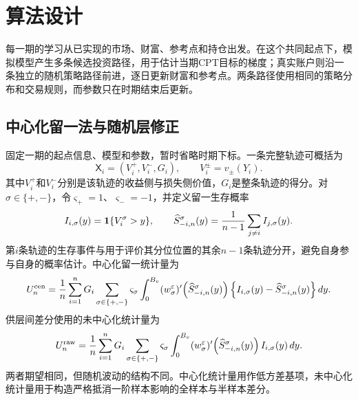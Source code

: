 \chapter{算法设计}\label{sec:algorithm}

每一期的学习从已实现的市场、财富、参考点和持仓出发。在这个共同起点下，模拟模型产生多条候选投资路径，用于估计当期CPT目标的梯度；真实账户则沿一条独立的随机策略路径前进，逐日更新财富和参考点。两条路径使用相同的策略分布和交易规则，而参数只在时期结束后更新。

\section{中心化留一法与随机层修正}

固定一期的起点信息、模型和参数，暂时省略时期下标。一条完整轨迹可概括为
\begin{equation}\label{eq:trajectory-summary}
 \mathsf X_i=(V_i^+,V_i^-,G_i),
 \qquad
 V_i^\pm=v_\pm(Y_i).
\end{equation}
其中$V_i^+$和$V_i^-$分别是该轨迹的收益侧与损失侧价值，$G_i$是整条轨迹的得分。对$\sigma\in\{+,-\}$，令$\varsigma_+=1$、$\varsigma_-=-1$，并定义留一生存概率
\begin{equation}\label{eq:loo-survival}
 I_{i,\sigma}(y)=\mathbf 1\{V_i^\sigma>y\},
 \qquad
 \widehat S_{-i,n}^\sigma(y)
 =\frac1{n-1}\sum_{j\ne i}I_{j,\sigma}(y).
\end{equation}
第$i$条轨迹的生存事件与用于评价其分位位置的其余$n-1$条轨迹分开，避免自身参与自身的概率估计。中心化留一统计量为
\begin{equation}\label{eq:centered-loo}
 U_n^{\rm cen}
 =\frac1n\sum_{i=1}^{n}G_i
 \sum_{\sigma\in\{+,-\}}\varsigma_\sigma
 \int_0^{B_v}
 (w_\sigma^\varepsilon)'\!\left(\widehat S_{-i,n}^\sigma(y)\right)
 \left\{I_{i,\sigma}(y)-\widehat S_{-i,n}^\sigma(y)\right\}dy.
\end{equation}
供层间差分使用的未中心化统计量为
\begin{equation}\label{eq:raw-loo}
 U_n^{\rm raw}
 =\frac1n\sum_{i=1}^{n}G_i
 \sum_{\sigma\in\{+,-\}}\varsigma_\sigma
 \int_0^{B_v}
 (w_\sigma^\varepsilon)'\!\left(\widehat S_{-i,n}^\sigma(y)\right)
 I_{i,\sigma}(y)\,dy.
\end{equation}
两者期望相同，但随机波动的结构不同。中心化统计量用作低方差基项，未中心化统计量用于构造严格抵消一阶样本影响的全样本与半样本差分。

